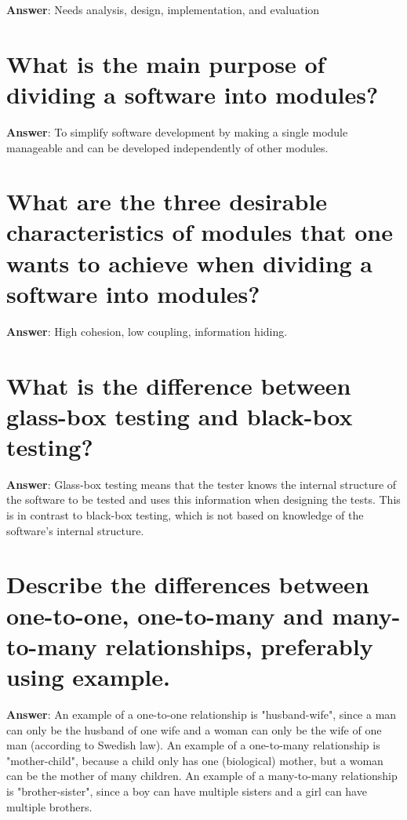\documentclass[a4paper,11pt,oneside]{book}
\begin{document}
\begin{sloppypar}
\label{q:226:sa:en:True}

\textbf{Answer}: Needs analysis, design, implementation, and evaluation



\section{What is the main purpose of dividing a software into modules?}

\label{q:227:sa:en:True}

\textbf{Answer}: To simplify software development by making a single module manageable and can be developed independently of other modules.



\section{What are the three desirable characteristics of modules that one wants to achieve when dividing a software into modules?}

\label{q:228:sa:en:True}

\textbf{Answer}: High cohesion, low coupling, information hiding.



\section{What is the difference between glass-box testing and black-box testing?}

\label{q:229:sa:en:True}

\textbf{Answer}: Glass-box testing means that the tester knows the internal structure of the software to be tested and uses this information when designing the tests. This is in contrast to black-box testing, which is not based on knowledge of the software's internal structure.



\section{Describe the differences between one-to-one, one-to-many and many-to-many relationships, preferably using example.}

\label{q:230:sa:en:True}

\textbf{Answer}: An example of a one-to-one relationship is "husband-wife", since a man can only be the husband of one wife and a woman can only be the wife of one man (according to Swedish law). An example of a one-to-many relationship is "mother-child", because a child only has one (biological) mother, but a woman can be the mother of many children. An example of a many-to-many relationship is "brother-sister", since a boy can have multiple sisters and a girl can have multiple brothers.




\end{sloppypar}
\end{document}
